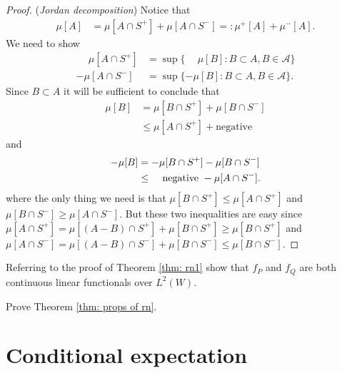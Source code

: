 \begin{shaded}
\begin{proof}
({\it Jordan decomposition}) Notice that
\begin{align*}
\mu[A]
& = \mu[A\cap S^+] + \mu[A\cap S^-] =:\mu^+[A] + \mu^-[A].
\end{align*}
We need to show
\begin{align*}
\phantom{-}\mu[A\cap S^+] & = \sup\{\phantom{-}\mu[B]\colon B\subset A, B\in \mathcal A  \} \\
-\mu[A\cap S^-] & = \sup\{-\mu[B]\colon B\subset A, B\in \mathcal A  \}.
\end{align*}
Since $B\subset A$ it will be sufficient to conclude that
\begin{align*}
\mu[B]
&= \mu[B\cap S^+] + \mu[B\cap S^-]\\
&\leq \mu[A\cap S^+] + \text{negative}
\end{align*}
and
\begin{align*}
-\mu[B] &= -\mu[B\cap S^+] - \mu[B\cap S^-]\\
&\leq \phantom{-}\text{\,\,negative\,\,} -  \mu[A\cap S^-].
\end{align*}
where the only thing we need is that $\mu[B\cap S^+]\leq \mu[A\cap S^+]$ and $\mu[B\cap S^-]\geq \mu[A\cap S^-]$. But these two inequalities are easy since $\mu[A\cap S^+] = \mu[(A-B)\cap S^+]+\mu[B\cap S^+]\geq \mu[B\cap S^+]$ and $\mu[A\cap S^-] = \mu[(A-B)\cap S^-]+\mu[B\cap S^-]\leq \mu[B\cap S^-]$.
\end{proof}



\end{shaded}





\begin{exercise}
\label{ex: for rn1 thm}
Referring to the proof of Theorem \ref{thm: rn1} show that $f_P$ and $f_Q$ are both continuous linear functionals over $L^2(W)$.
\end{exercise}


\begin{exercise}
\label{ex: for rn2 thm}
Prove Theorem \ref{thm: props of rn}.
\end{exercise}


\clearpage
%
%
\section{Conditional expectation}

